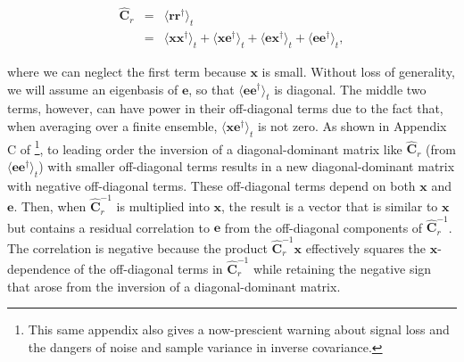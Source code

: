\documentclass[preprint2,numberedappendix,tighten]{aastex6}  %
\begin{document}
\begin{eqnarray}
\widehat{\textbf{C}}_{r} &=& \langle \textbf{rr}^{\dagger} \rangle_{t} \nonumber \\ 
&=& \langle \textbf{xx}^{\dagger} \rangle_{t} + \langle \textbf{xe}^{\dagger} \rangle_{t} + \langle \textbf{ex}^{\dagger} \rangle_{t} + \langle 
\textbf{ee}^{\dagger} \rangle_{t},
\end{eqnarray}

\noindent where we can neglect the first term because $\textbf{x}$ is small.  Without loss of generality, we will assume
an eigenbasis of $\textbf{e}$, so that $\langle 
\textbf{ee}^{\dagger} \rangle_{t}$ is diagonal. The middle 
two terms, however, can have power in their off-diagonal terms due to the fact that, when averaging over a finite
ensemble, $\langle\textbf{xe}^\dagger\rangle_t$ is not zero.  As shown in Appendix C of \citet{parsons_et_al2014}\footnote{This same appendix also gives a now-prescient warning about signal loss and the dangers of noise and sample variance in inverse covariance.}, to leading order the inversion of a diagonal-dominant matrix like $\widehat{\textbf{C}}_{r}$ (from $\langle 
\textbf{ee}^{\dagger} \rangle_{t}$) with smaller
off-diagonal terms results in a new diagonal-dominant matrix with negative off-diagonal terms. These off-diagonal
terms depend on both $\textbf{x}$ and $\textbf{e}$. Then, when $\widehat{\textbf{C}}^{-1}_{r}$ is multiplied into $\textbf{x}$,
the result is a vector that is similar to $\textbf{x}$ but
contains a residual correlation to $\textbf{e}$ from the off-diagonal components of $\widehat{\textbf{C}}^{-1}_{r}$. The
correlation is negative because the product $\widehat{\textbf{C}}_r^{-1}\textbf{x}$ effectively squares the $\textbf{x}$-dependence
of the off-diagonal terms in $\widehat{\textbf{C}}^{-1}_{r}$ while retaining the negative sign that arose from the inversion
of a diagonal-dominant matrix.

\end{document}

